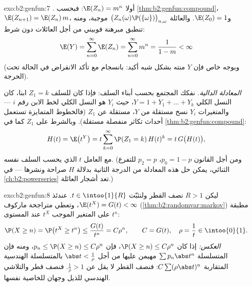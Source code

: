 \begin{solution}{exo:b2:genfun:7}
\emph{.} أولا $\E(Z_n) = m^n$: فبحسب \cref{thm:b2:genfun:compound}، $\E(Z_{n+1}) = \E(Z_n)\,m$، و$\E(Z_0) = 1$.
والعائلة $\bigl(Z_n(\omega)\P(\{\omega\})
\bigr)_{n, \omega}$ موجبة، ومنه تنطبق مبرهنة فوبيني من أجل العائلات دون
شرط:
\[
\E(Y) = \sum_{n=0}^{\infty}\E(Z_n)
= \sum_{n=0}^\infty m^n = \frac{1}{1 - m} < \infty
\]
(وبوجه خاص فإن $Y$ منته بشكل شبه أكيد: بانسجام مع تأكد الانقراض
في الحالة تحت الحرجة).

\emph{المعادلة الدالية.} نفكك المجتمع بحسب أبناء السلف: فإذا كان
للسلف $Z_1 = k$ ابنا، كان النسل الكلي $Y = 1 + Y_1 + \dots + Y_k$، حيث $Y_i$ هو النسل الكلي
لخط الابن رقم $i$ --- والمتغيرات $Y_i$ نسخ مستقلة من $Y$،
مستقلة عن $Z_1$ (فالخطوط المتمايزة تستعمل أحداث تكاثر منفصلة
مستقلة). وبالشرط على $Z_1$ كما في \cref{thm:b2:genfun:compound}:
\[
H(t) = \E\bigl(t^Y\bigr)
= t\sum_{k=0}^\infty \P(Z_1 = k)\,H(t)^k
= t\,G\bigl(H(t)\bigr),
\]
مع العامل $t$ الذي يحسب السلف نفسه. (ومن أجل القانون $p_0 = 1 - p$،
$p_2 = p$ للتفرع الثنائي، يمكن حل هذه المعادلة من الدرجة الثانية بدلالة
$H$ صراحة ونشرها ---  في \cref{ch:b2:powerseries} تعد أشجار العائلة.)
\end{solution}

\begin{solution}{exo:b2:genfun:8}
ليكن $R > 1$ نصف القطر ولنثبّت $t \in \intoo{1}{R}$. عندئذ $\E(t^X) = G(t) < \infty$، وتعطي متراجحة
ماركوف (\cref{thm:b2:randomvar:markov}) مطبقة على المتغير الموجب $t^X$ عند المستوى $t^n$:
\[
\P(X \geq n) = \P\bigl(t^X \geq t^n\bigr)
\leq \frac{G(t)}{t^n} = C\rho^n,
\qquad C = G(t),\quad \rho = \frac1t \in \intoo{0}{1}.
\]
\emph{العكس:} إذا كان $\P(X \geq n) \leq C\rho^n$، فإن $p_n \leq
\P(X \geq n) \leq C\rho^n$، ومنه فإن المتسلسلة $\sum p_n\abs t^n$
مهيمن عليها من أجل $\abs t < \frac1\rho$ بالمتسلسلة الهندسية المتقاربة $C\sum(\rho\abs t)^n$:
فنصف القطر لا يقل عن $\frac1\rho > 1$. فنصف قطر  والتلاشي
الهندسي للذيل وجهان للخاصية نفسها.
\end{solution}

